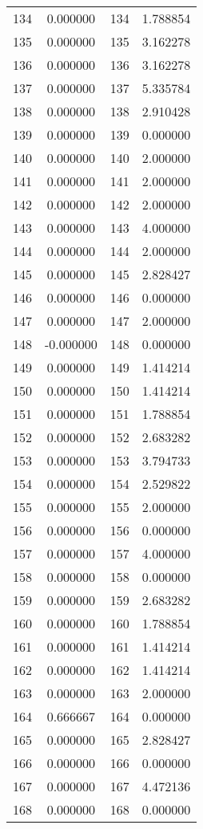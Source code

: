 \documentclass[12pt]{article}
\begin{document}
\begin{longtable}{@{}cccc@{}}
134 & 0.000000 & 134 & 1.788854 \\
135 & 0.000000 & 135 & 3.162278 \\
136 & 0.000000 & 136 & 3.162278 \\
137 & 0.000000 & 137 & 5.335784 \\
138 & 0.000000 & 138 & 2.910428 \\
139 & 0.000000 & 139 & 0.000000 \\
140 & 0.000000 & 140 & 2.000000 \\
141 & 0.000000 & 141 & 2.000000 \\
142 & 0.000000 & 142 & 2.000000 \\
143 & 0.000000 & 143 & 4.000000 \\
144 & 0.000000 & 144 & 2.000000 \\
145 & 0.000000 & 145 & 2.828427 \\
146 & 0.000000 & 146 & 0.000000 \\
147 & 0.000000 & 147 & 2.000000 \\
148 & -0.000000 & 148 & 0.000000 \\
149 & 0.000000 & 149 & 1.414214 \\
150 & 0.000000 & 150 & 1.414214 \\
151 & 0.000000 & 151 & 1.788854 \\
152 & 0.000000 & 152 & 2.683282 \\
153 & 0.000000 & 153 & 3.794733 \\
154 & 0.000000 & 154 & 2.529822 \\
155 & 0.000000 & 155 & 2.000000 \\
156 & 0.000000 & 156 & 0.000000 \\
157 & 0.000000 & 157 & 4.000000 \\
158 & 0.000000 & 158 & 0.000000 \\
159 & 0.000000 & 159 & 2.683282 \\
160 & 0.000000 & 160 & 1.788854 \\
161 & 0.000000 & 161 & 1.414214 \\
162 & 0.000000 & 162 & 1.414214 \\
163 & 0.000000 & 163 & 2.000000 \\
164 & 0.666667 & 164 & 0.000000 \\
165 & 0.000000 & 165 & 2.828427 \\
166 & 0.000000 & 166 & 0.000000 \\
167 & 0.000000 & 167 & 4.472136 \\
168 & 0.000000 & 168 & 0.000000 \\

\end{longtable}
\end{document}
